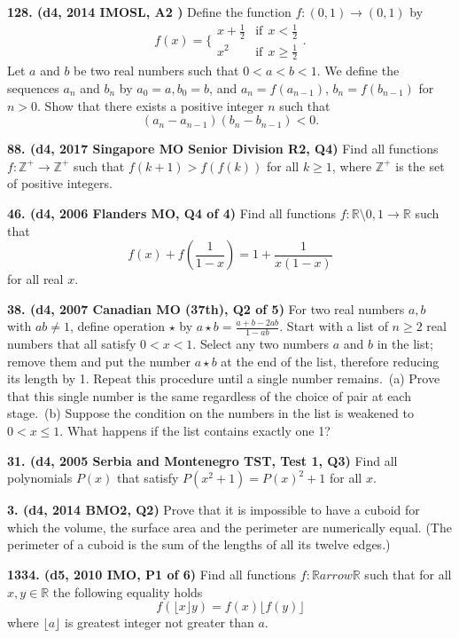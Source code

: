 \documentclass{article}
\begin{document}
\textbf{128. (\color{red}d4\color{black}, 2014 IMOSL, A2 )} Define the function $f:(0,1)\to (0,1)$ by \[\displaystyle f(x) = \{ \begin{array}{lr} x+\frac 12 & \text{if}\ \  x < \frac 12\\ x^2 & \text{if}\ \  x \ge \frac 12 \end{array} .\] Let $a$ and $b$ be two real numbers such that $0 < a < b < 1$. We define the sequences $a_n$ and $b_n$ by $a_0 = a, b_0 = b$, and $a_n = f( a_{n -1})$, $b_n = f (b_{n -1} )$ for $n > 0$. Show that there exists a positive integer $n$ such that \[(a_n - a_{n-1})(b_n-b_{n-1})<0.\]

\textbf{88. (\color{red}d4\color{black}, 2017 Singapore MO Senior Division R2, Q4)} Find all functions $f : \mathbb{Z}^{+} \to \mathbb{Z}^{+}$ such that $f(k+1) > f(f(k))$ for all $k \geq 1$, where $\mathbb{Z}^{+}$ is the set of positive integers.

\textbf{46. (\color{red}d4\color{black}, 2006 Flanders MO, Q4 of 4)} Find all functions $f:\mathbb{R}\setminus{0,1}\to\mathbb{R}$ such that \begin{equation}f(x) + f(\frac{1}{1-x})  = 1 + \frac{1}{x(1-x)}\end{equation} for all real $x$.

\textbf{38. (\color{red}d4\color{black}, 2007 Canadian MO (37th), Q2 of 5)} For two real numbers $a,b$ with $ab \neq 1$, define operation $\star$ by $a \star b = \frac{a + b - 2ab}{1 - ab}$. Start with a list of $n \geq 2$ real numbers that all satisfy $0 < x < 1$. Select any two numbers $a$ and $b$ in the list; remove them and put the number $a \star b$ at the end of the list, therefore reducing its length by 1. Repeat this procedure until a single number remains.\
(a) Prove that this single number is the same regardless of the choice of pair at each stage.\
(b) Suppose the condition on the numbers in the list is weakened to $0 < x \leq 1$. What happens if the list contains exactly one 1?

\textbf{31. (\color{red}d4\color{black}, 2005 Serbia and Montenegro TST, Test 1, Q3)} Find all polynomials $P(x)$ that satisfy $P(x^2+1) = P(x)^2 + 1$ for all $x$.

\textbf{3. (\color{red}d4\color{black}, 2014 BMO2, Q2)} Prove that it is impossible to have a cuboid for which the volume, the surface area and the perimeter are numerically equal. (The perimeter of a cuboid is the sum of the lengths of all its twelve edges.)

\textbf{1334. (\color{red}d5\color{black}, 2010 IMO, P1 of 6)} Find all functions $f:\mathbb{R}arrow\mathbb{R}$ such that for all $x,y\in\mathbb{R}$ the following equality holds \[ f(\lfloor x\rfloor y)=f(x)\lfloor f(y)\rfloor \] where $\lfloor a\rfloor $ is greatest integer not greater than $a$.
\end{document}
